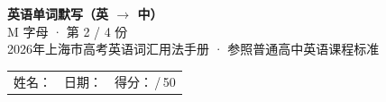 \documentclass[10pt,a4paper]{article}
\begin{document}
\pagestyle{plain}

\begin{center}
{\LARGE\bfseries 英语单词默写（英 $\to$ 中）}\\[0.22em]
{\large M 字母 · 第 2 / 4 份}\\[0.18em]
{\small 2026年上海市高考英语词汇用法手册 · 参照普通高中英语课程标准}
\end{center}

\vspace{0.25em}
\noindent\begin{tabular}{@{}p{}@{}p{}@{}p{}@{}}
姓名：\underline{\hspace{2.0cm}} & 日期：\underline{\hspace{2.0cm}} & 得分：\underline{\hspace{1.3cm}}\,/\,50 \\
\end{tabular}

\vspace{0.3em}

\vspace{0.08em}
\end{document}
